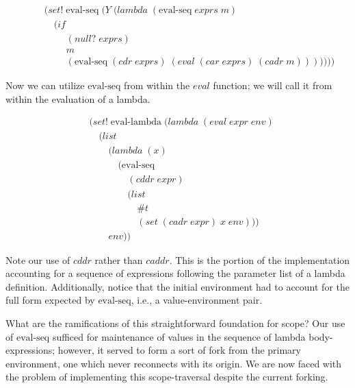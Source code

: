 \begin{figure}[htp]
\footnotesize
\caption{}\label{fig:evalSeqPrelude}
\begin{align*}
& (set! \; \text{eval-seq} \; (Y \; (lambda \; (\text{eval-seq} \; exprs \; m)
\\& \quad (if
\\& \qquad \; (null? \; exprs)
\\& \qquad \; m
\\& \qquad \; (\text{eval-seq} \; (cdr \; exprs) \; (eval \; (car \; exprs) \; (cadr \; m)))))))
\end{align*}
\end{figure}

Now we can utilize $\text{eval-seq}$ from within the $eval$ function; we will call
it from within the evaluation of a lambda.

\begin{figure}[htp]
\footnotesize
\caption{}\label{fig:multiExprEvalLambda}
\begin{align*}
& (set! \; \text{eval-lambda} \; (lambda \; (eval \; expr \; env)
\\& \quad (list
\\& \qquad (lambda \; (x) \; 
\\& \qquad \quad (\text{eval-seq} \; 
\\& \qquad \qquad (cddr \; expr) \; 
\\& \qquad \qquad (list
\\& \qquad \qquad \quad \#t
\\& \qquad \qquad \quad (set \; (cadr \; expr) \; x \; env)))
\\& \qquad env))
\end{align*}
\end{figure}

Note our use of $cddr$ rather than $caddr$. This is the portion of the
implementation accounting for a sequence of expressions following the
parameter list of a lambda definition. Additionally, notice that the initial
environment had to account for the full form expected by $\text{eval-seq}$, i.e.,
a value-environment pair.

What are the ramifications of this straightforward foundation for scope? Our
use of $\text{eval-seq}$ sufficed for maintenance of values in the sequence of 
lambda body-expressions; however, it served to form a sort of fork from the
primary environment, one which never reconnects with its origin. We are now
faced with the problem of implementing this scope-traversal despite the
current forking.


